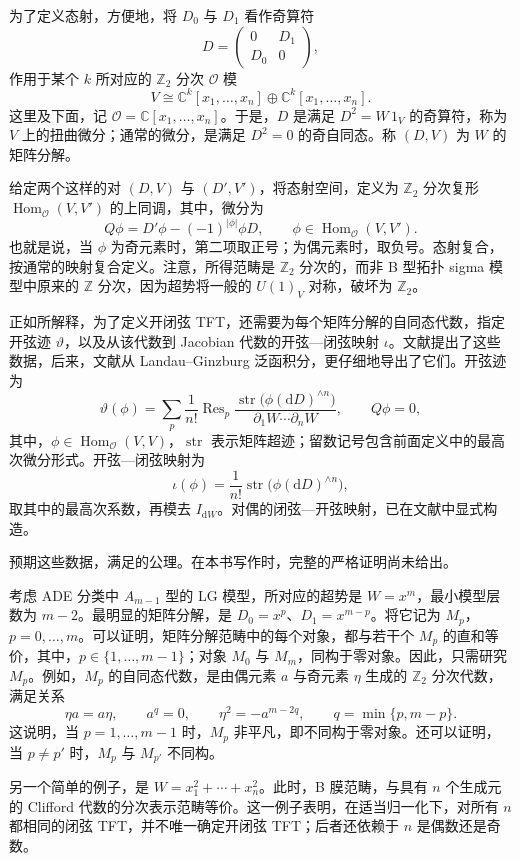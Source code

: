 为了定义态射，方便地，将 $D_0$ 与 $D_1$ 看作奇算符
\[
D=\begin{pmatrix}0&D_1\\D_0&0\end{pmatrix},
\]
作用于某个 $k$ 所对应的 $\mathbb{Z}_2$ 分次 $\mathcal{O}$ 模
\[
V\cong\mathbb{C}^k[x_1,\ldots,x_n]
\oplus\mathbb{C}^k[x_1,\ldots,x_n].
\]
这里及下面，记 $\mathcal{O}=\mathbb{C}[x_1,\ldots,x_n]$。于是，$D$ 是满足 $D^2=W\,1_V$ 的奇算符，称为 $V$ 上的扭曲微分；通常的微分，是满足 $D^2=0$ 的奇自同态。称 $(D,V)$ 为 $W$ 的矩阵分解。

给定两个这样的对 $(D,V)$ 与 $(D',V')$，将态射空间，定义为 $\mathbb{Z}_2$ 分次复形 $\operatorname{Hom}_{\mathcal{O}}(V,V')$ 的上同调，其中，微分为
\[
Q\phi=D'\phi-(-1)^{|\phi|}\phi D,
\qquad\phi\in\operatorname{Hom}_{\mathcal{O}}(V,V').
\]
也就是说，当 $\phi$ 为奇元素时，第二项取正号；为偶元素时，取负号。态射复合，按通常的映射复合定义。注意，所得范畴是 $\mathbb{Z}_2$ 分次的，而非 B 型拓扑 sigma 模型中原来的 $\mathbb{Z}$ 分次，因为超势将一般的 $U(1)_V$ 对称，破坏为 $\mathbb{Z}_2$。

正如所解释，为了定义开闭弦 TFT，还需要为每个矩阵分解的自同态代数，指定开弦迹 $\vartheta$，以及从该代数到 Jacobian 代数的开弦—闭弦映射 $\iota$。文献提出了这些数据，后来，文献从 Landau--Ginzburg 泛函积分，更仔细地导出了它们。开弦迹为
\[
\vartheta(\phi)=\sum_p\frac1{n!}\operatorname{Res}_p
\frac{\operatorname{str}\bigl(\phi(\mathrm{d}D)^{\wedge n}\bigr)}
{\partial_1W\cdots\partial_nW},
\qquad Q\phi=0,
\]
其中，$\phi\in\operatorname{Hom}_{\mathcal{O}}(V,V)$，$\operatorname{str}$ 表示矩阵超迹；留数记号包含前面定义中的最高次微分形式。开弦—闭弦映射为
\[
\iota(\phi)=\frac1{n!}
\operatorname{str}\bigl(\phi(\mathrm{d}D)^{\wedge n}\bigr),
\]
取其中的最高次系数，再模去 $I_{\mathrm{d}W}$。对偶的闭弦—开弦映射，已在文献中显式构造。

预期这些数据，满足的公理。在本书写作时，完整的严格证明尚未给出。

\begin{example*}
考虑 ADE 分类中 $A_{m-1}$ 型的 LG 模型，所对应的超势是 $W=x^m$，最小模型层数为 $m-2$。最明显的矩阵分解，是 $D_0=x^p$、$D_1=x^{m-p}$。将它记为 $M_p$，$p=0,\ldots,m$。可以证明，矩阵分解范畴中的每个对象，都与若干个 $M_p$ 的直和等价，其中，$p\in\{1,\ldots,m-1\}$；对象 $M_0$ 与 $M_m$，同构于零对象。因此，只需研究 $M_p$。例如，$M_p$ 的自同态代数，是由偶元素 $a$ 与奇元素 $\eta$ 生成的 $\mathbb{Z}_2$ 分次代数，满足关系
\[
\eta a=a\eta,\qquad a^q=0,\qquad
\eta^2=-a^{m-2q},\qquad q=\min\{p,m-p\}.
\]
这说明，当 $p=1,\ldots,m-1$ 时，$M_p$ 非平凡，即不同构于零对象。还可以证明，当 $p\ne p'$ 时，$M_p$ 与 $M_{p'}$ 不同构。
\end{example*}

\begin{example*}
另一个简单的例子，是 $W=x_1^2+\cdots+x_n^2$。此时，B 膜范畴，与具有 $n$ 个生成元的 Clifford 代数的分次表示范畴等价。这一例子表明，在适当归一化下，对所有 $n$ 都相同的闭弦 TFT，并不唯一确定开闭弦 TFT；后者还依赖于 $n$ 是偶数还是奇数。
\end{example*}
